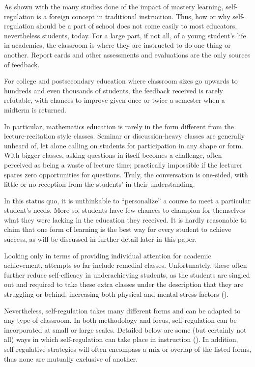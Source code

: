 As shown with the many studies done of the impact of mastery learning, self-regulation is a foreign concept in traditional instruction. Thus, how or why self-regulation should be a part of school does not come easily to most educators, nevertheless students, today. For a large part, if not all, of a young student's life in academics, the classroom is where they are instructed to do one thing or another. Report cards and other assessments and evaluations are the only sources of feedback.

For college and postsecondary education where classroom sizes go upwards to hundreds and even thousands of students, the feedback received is rarely refutable, with chances to improve given once or twice a semester when a midterm is returned.

In particular, mathematics education is rarely in the form different from the lecture-recitation style classes. Seminar or discussion-heavy classes are generally unheard of, let alone calling on students for participation in any shape or form. With bigger classes, asking questions in itself becomes a challenge, often perceived as being a waste of lecture time; practically impossible if the lecturer spares zero opportunities for questions. Truly, the conversation is one-sided, with little or no reception from the students' in their understanding.

In this status quo, it is unthinkable to ``personalize'' a course to meet a particular student's needs. More so, students have few chances to champion for themselves what they were lacking in the education they received. It is hardly reasonable to claim that one form of learning is the best way for every student to achieve success, as will be discussed in further detail later in this paper.

Looking only in terms of providing individual attention for academic achievement, attempts so far include remedial classes. Unfortunately, these often further reduce self-efficacy in underachieving students, as the students are singled out and required to take these extra classes under the description that they are struggling or behind, increasing both physical and mental stress factors (\cite{martin_developmental_2017}).

Nevertheless, self-regulation takes many different forms and can be adapted to any type of classroom. In both methodology and focus, self-regulation can be incorporated at small or large scales. Detailed below are some (but certainly not all) ways in which self-regulation can take place in instruction (\cite{montague_self-regulation_2007}). In addition, self-regulative strategies will often encompass a mix or overlap of the listed forms, thus none are mutually exclusive of another.

